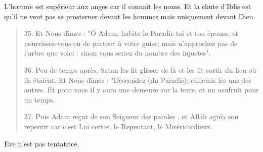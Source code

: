 L'homme est supérieur aux anges car il connait les noms. Et la chute d'Iblis est qu'il ne veut pas se prosterner devant les hommes mais uniquement devant Dieu.


\begin{quote}
    35. Et Nous dîmes : "Ô Adam, habite le Paradis toi et ton épouse, et nourrissez-vous-en de partout à votre guise; mais n'approchez pas de l'arbre que voici : sinon vous seriez du nombre des injustes".

36. Peu de temps après, Satan les fit glisser de là et les fit sortir du lieu où ils étaient. Et Nous dîmes : "Descendez (du Paradis); ennemis les uns des autres. Et pour vous il y aura une demeure sur la terre, et un usufruit pour un temps.

37. Puis Adam reçut de son Seigneur des paroles , et Allah agréa son repentir car c'est Lui certes, le Repentant, le Miséricordieux.
\end{quote}
Eve n'est pas tentatrice.


